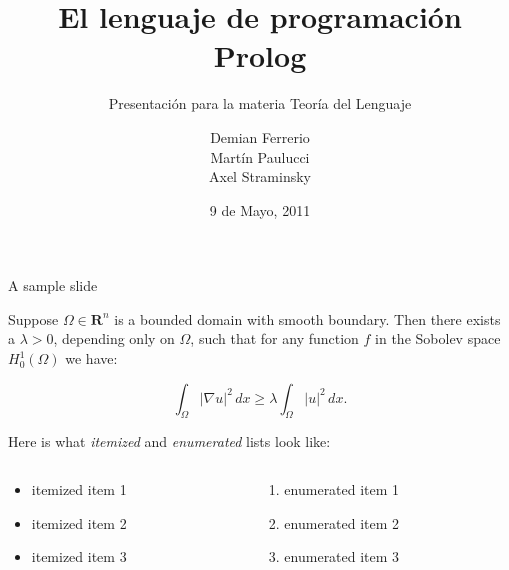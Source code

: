 \documentclass[xcolor=dvipsnames]{beamer}
\title{El lenguaje de programación Prolog}
\subtitle{Presentación para la materia Teoría del Lenguaje}
\author{
Demian Ferrerio\\
Martín Paulucci\\
Axel Straminsky}
\institute[UMBC]{
  Facultad de Ingeniería\\
  Universidad de Buenos Aires \\
}
\date{9 de Mayo, 2011}
\begin{document}
\begin{frame}[plain]
  \titlepage
\end{frame}

\begin{frame}{A sample slide}

\begin{theorem}
Suppose $\Omega\in\mathbf{R}^n$ is a bounded domain with smooth
boundary.  Then there exists a $\lambda>0$, depending only on
$\Omega$, such that for any function $f$ in the Sobolev space
$H^1_0(\Omega)$ we have:

\[
  \int_\Omega |\nabla u|^2 \,dx \ge 
  \lambda \int_\Omega |u|^2 \,dx .
\]
\end{theorem}

Here is what \emph{itemized} and \emph{enumerated} lists look like:

\begin{columns}
  \begin{column}{0.45\textwidth}
  \begin{itemize}
    \item itemized item 1
    \item itemized item 2
    \item itemized item 3
  \end{itemize}
  \end{column}

  \begin{column}{0.45\textwidth}
  \begin{enumerate}
    \item enumerated item 1
    \item enumerated item 2
    \item enumerated item 3
  \end{enumerate}
  \end{column}
\end{columns}

\end{frame}
\end{document}
